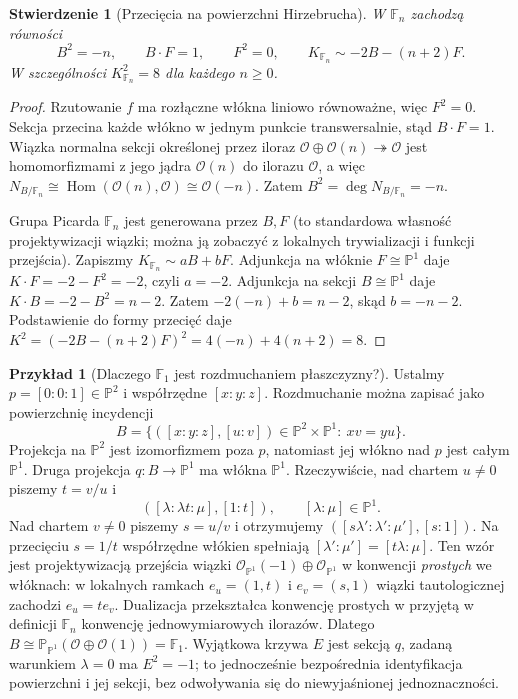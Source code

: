 \documentclass[11pt,a4paper,openany]{report}
\numberwithin{equation}{section}
\theoremstyle{plain}
\newtheorem{stwierdzenie}[twierdzenie]{Stwierdzenie}
\theoremstyle{definition}
\newtheorem{przyklad}[twierdzenie]{Przykład}
\theoremstyle{remark}
\newcommand{\PP}{\mathbb P}
\begin{document}
\begin{stwierdzenie}[Przecięcia na powierzchni Hirzebrucha]
\label{st:ga6-hirzebruch}
W $\mathbb F_n$ zachodzą równości
\[
 B^2=-n,\qquad B\cdot F=1,\qquad F^2=0,
 \qquad K_{\mathbb F_n}\sim-2B-(n+2)F.
\]
W szczególności $K_{\mathbb F_n}^2=8$ dla każdego $n\ge0$.
\end{stwierdzenie}
\begin{proof}
Rzutowanie $f$ ma rozłączne włókna liniowo równoważne,
więc $F^2=0$. Sekcja przecina każde włókno w jednym
punkcie transwersalnie, stąd $B\cdot F=1$.
Wiązka normalna sekcji określonej przez iloraz
$\mathcal O\oplus\mathcal O(n)\twoheadrightarrow\mathcal O$
jest homomorfizmami z jego jądra $\mathcal O(n)$
do ilorazu $\mathcal O$, a więc
$N_{B/\mathbb F_n}\cong\operatorname{Hom}
(\mathcal O(n),\mathcal O)\cong\mathcal O(-n)$.
Zatem $B^2=\deg N_{B/\mathbb F_n}=-n$.

Grupa Picarda $\mathbb F_n$ jest generowana przez
$B,F$ (to standardowa własność projektywizacji
wiązki; można ją zobaczyć z lokalnych trywializacji
i funkcji przejścia). Zapiszmy
$K_{\mathbb F_n}\sim aB+bF$. Adjunkcja na włóknie
$F\cong\PP^1$ daje $K\cdot F=-2-F^2=-2$,
czyli $a=-2$. Adjunkcja na sekcji $B\cong\PP^1$
daje $K\cdot B=-2-B^2=n-2$.
Zatem $-2(-n)+b=n-2$, skąd $b=-n-2$.
Podstawienie do formy przecięć daje
$K^2=(-2B-(n+2)F)^2=4(-n)+4(n+2)=8$.
\end{proof}

\begin{przyklad}[Dlaczego $\mathbb F_1$ jest rozdmuchaniem płaszczyzny?]
\label{prz:ga6-f1}
Ustalmy $p=[0:0:1]\in\PP^2$ i współrzędne $[x:y:z]$.
Rozdmuchanie można zapisać jako powierzchnię incydencji
\[
B=\{([x:y:z],[u:v])\in\PP^2\times\PP^1:\ xv=yu\}.
\]
Projekcja na $\PP^2$ jest izomorfizmem poza $p$, natomiast
jej włókno nad $p$ jest całym $\PP^1$.
Druga projekcja $q:B\to\PP^1$ ma włókna $\PP^1$.
Rzeczywiście, nad chartem $u\ne0$ piszemy $t=v/u$ i
\[
([\lambda:\lambda t:\mu],[1:t]),\qquad[\lambda:\mu]\in\PP^1.
\]
Nad chartem $v\ne0$ piszemy $s=u/v$ i otrzymujemy
$([s\lambda':\lambda':\mu'],[s:1])$.
Na przecięciu $s=1/t$ współrzędne włókien spełniają
$[\lambda':\mu']=[t\lambda:\mu]$. Ten wzór jest
projektywizacją przejścia wiązki
$\mathcal O_{\PP^1}(-1)\oplus\mathcal O_{\PP^1}$
w konwencji \emph{prostych} we włóknach: w lokalnych
ramkach $e_u=(1,t)$ i $e_v=(s,1)$ wiązki tautologicznej
zachodzi $e_u=t e_v$.
Dualizacja przekształca konwencję prostych w przyjętą
w definicji $\mathbb F_n$ konwencję jednowymiarowych ilorazów.
Dlatego
$B\cong\PP_{\PP^1}(\mathcal O\oplus\mathcal O(1))=\mathbb F_1$.
Wyjątkowa krzywa $E$ jest sekcją $q$, zadaną warunkiem
$\lambda=0$ ma $E^2=-1$; to jednocześnie
bezpośrednia identyfikacja powierzchni i jej sekcji,
bez odwoływania się do niewyjaśnionej jednoznaczności.
\end{przyklad}
\end{document}
